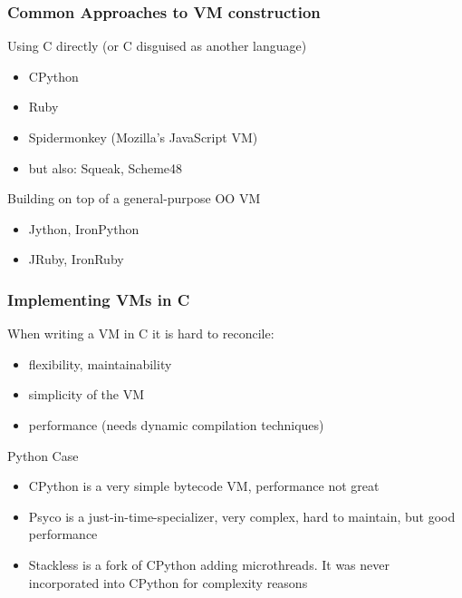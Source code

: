 \documentclass[utf8x]{beamer}
\begin{document}
\begin{frame}
  \frametitle{Common Approaches to VM construction}
  \begin{block}{
    Using C directly (or C disguised as another language)}
    \begin{itemize}
    \item
      CPython
    \item
      Ruby
    \item
      Spidermonkey (Mozilla's JavaScript VM)
    \item
      but also: Squeak, Scheme48
    \end{itemize}
  \end{block}
  \begin{block}{
    Building on top of a general-purpose OO VM}
    \begin{itemize}
    \item
      Jython, IronPython
    \item
      JRuby, IronRuby
    \end{itemize}
  \end{block}
\end{frame}

\begin{frame}
  \frametitle{Implementing VMs in C}
  When writing a VM in C it is hard to reconcile:
  \begin{itemize}
  \item
    flexibility, maintainability
  \item
    simplicity of the VM
  \item
    performance (needs dynamic compilation techniques)
  \end{itemize}
  \pause
  \begin{block}{
    Python Case}
    \begin{itemize}
    \item
      \alert{CPython} is a very simple bytecode VM, performance not great
    \item
      \alert{Psyco} is a just-in-time-specializer, very complex, hard to
      maintain, but good performance
    \item
      \alert{Stackless} is a fork of CPython adding microthreads. It was never
      incorporated into CPython for complexity reasons
    \end{itemize}
  \end{block}
\end{frame}
\end{document}
